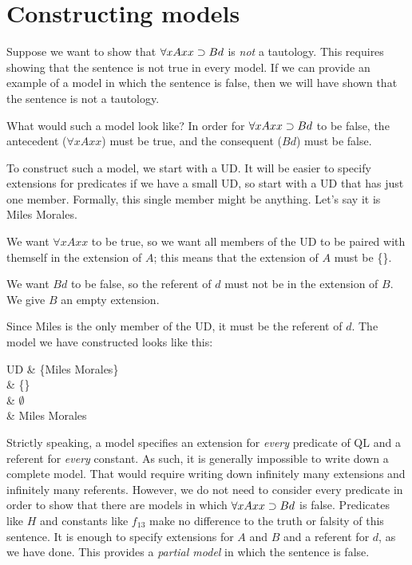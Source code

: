 \section{Constructing models}

Suppose we want to show that $\forall xAxx \supset Bd$ is \emph{not} a tautology. This requires showing that the sentence is not true in every model. If we can provide an example of a model in which the sentence is false, then we will have shown that the sentence is not a tautology.

What would such a model look like? In order for $\forall xAxx \supset Bd$ to be false, the antecedent ($\forall x Axx$) must be true, and the consequent ($Bd$) must be false.

To construct such a model, we start with a UD. It will be easier to specify extensions for predicates if we have a small UD, so start with a UD that has just one member. Formally, this single member might be anything. Let's say it is Miles Morales.

We want $\forall x Axx$ to be true, so we want all members of the UD to be paired with themself in the extension of $A$; this means that the extension of $A$ must be \{\}.

We want $Bd$ to be false, so the referent of $d$ must not be in the extension of $B$. We give $B$ an empty extension.

Since Miles is the only member of the UD, it must be the referent of $d$. The model we have constructed looks like this:
\begin{partialmodel}
	UD			& \{Miles Morales\}\\
	 	& \{\}\\
		& $\emptyset$\\
		& Miles Morales
\end{partialmodel}

Strictly speaking, a model specifies an extension for \emph{every} predicate of QL and a referent for \emph{every} constant. As such, it is generally impossible to write down a complete model. That would require writing down infinitely many extensions and infinitely many referents. However, we do not need to consider every predicate in order to show that there are models in which $\forall xAxx \supset Bd$ is false. Predicates like $H$ and constants like $f_{13}$ make no difference to the truth or falsity of this sentence. It is enough to specify extensions for $A$ and $B$ and a referent for $d$, as we have done. This provides a \emph{partial model} in which the sentence is false.

